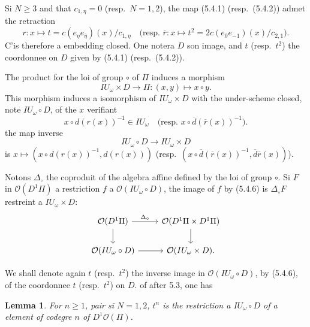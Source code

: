 \documentclass[11pt,a4paper]{article}
\theoremstyle{plain}
\newtheorem{lemma}[theorem]{Lemma}
\theoremstyle{definition}
\begin{document}
Si $N \geq 3$ and that $c_{1,\eta} = 0$ (resp.~$N=1,2$), the map (5.4.1) (resp.~(5.4.2)) admet the retraction
\begin{equation}\label{eq:5.4.3}
r: x \mapsto t = c(e_\eta e_{\overline{\eta}})(x)/c_{1,\eta} \quad \text{(resp. } \overline{r}: x \mapsto t^2 = 2c(e_0 e_{-1})(x)/c_{2,1} \text{)}.
\end{equation}
C'is therefore a embedding closed. One notera $D$ son image, and $t$ (resp.~$t^2$) the coordonnee on $D$ given by (5.4.1) (resp.~(5.4.2)).

The product for the loi of group $\circ$ of $\Pi$ induces a morphism
\begin{equation}\label{eq:5.4.4}
IU_\omega \times D \to \Pi: (x,y) \mapsto x \circ y.
\end{equation}
This morphism induces a isomorphism of $IU_\omega \times D$ with the under-scheme closed, note $IU_\omega \circ D$, of the $x$ verifiant
\begin{equation}\label{eq:5.4.5}
x \circ d(r(x))^{-1} \in IU_\omega \quad \text{(resp. } x \circ \overline{d}(\overline{r}(x))^{-1} \text{)}.
\end{equation}
the map inverse
\begin{equation}\label{eq:5.4.6}
IU_\omega \circ D \to IU_\omega \times D
\end{equation}
is $x \mapsto (x \circ d(r(x))^{-1}, d(r(x)))$ (resp.~$(x \circ \overline{d}(\overline{r}(x))^{-1}, \overline{d}\overline{r}(x))$).

Notons $\Delta_\circ$ the coproduit of the algebra affine defined by the loi of group $\circ$. Si $F$ in $\mathcal{O}(D^1\Pi)$ a restriction $f$ a $\mathcal{O}(IU_\omega \circ D)$, the image of $f$ by (5.4.6) is $\Delta_\circ F$ restreint a $IU_\omega \times D$:
\begin{equation}\label{eq:5.4.7}
\begin{tikzcd}
\mathcal{O}(D^1\Pi) \arrow{r}{\Delta_\circ} \arrow{d} & \mathcal{O}(D^1\Pi \times D^1\Pi) \arrow{d} \\
\mathcal{O}(IU_\omega \circ D) \arrow{r} & \mathcal{O}(IU_\omega \times D).
\end{tikzcd}
\end{equation}

We shall denote again $t$ (resp.~$t^2$) the inverse image in $\mathcal{O}(IU_\omega \circ D)$, by (5.4.6), of the coordonnee $t$ (resp.~$t^2$) on $D$. of after 5.3, one has

\begin{lemma}\label{lem:5.5}
For $n \geq 1$, pair si $N=1,2$, $t^n$ is the restriction a $IU_\omega \circ D$ of a element of codegre $n$ of $D^1\mathcal{O}(\Pi)$.
\end{lemma}
\end{document}
